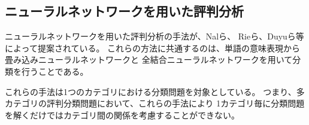 \documentclass{ttisummary}
\begin{document}


\subsection{ニューラルネットワークを用いた評判分析}

ニューラルネットワークを用いた評判分析の手法が、Nalら\cite{nal14}、
Rieら\cite{rie14}、Duyuら\cite{duyu15}等によって提案されている。
これらの方法に共通するのは、単語の意味表現から畳み込みニューラルネットワークと
全結合ニューラルネットワークを用いて分類を行うことである。

これらの手法は1つのカテゴリにおける分類問題を対象としている。
つまり、多カテゴリの評判分類問題において、これらの手法により
1カテゴリ毎に分類問題を解くだけではカテゴリ間の関係を考慮することができない。
\end{document}
